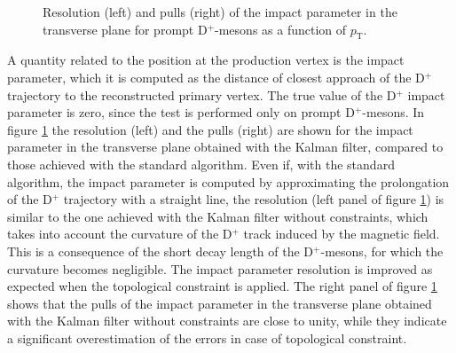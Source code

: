 \documentclass[b5paper,10pt,twoside,oldstyle,classica]{toptesi}
\newcommand{\pt}{p_\text{T}}
\begin{document}
\begin{figure}[b]
\begin{center}
\caption{Resolution (left) and pulls (right) of the impact parameter in the transverse plane for prompt D$^+$-mesons as a function of $\pt$.}
\label{KF_imppar}
\end{center}
\end{figure} A quantity related to the position at the production vertex is the impact parameter, which it is computed as the distance of closest approach of the D$^+$ trajectory to the reconstructed primary vertex. The true value of the D$^+$ impact parameter is zero, since the test is performed only on prompt D$^+$-mesons. In figure \ref{KF_imppar} the resolution (left) and the pulls (right) are shown for the impact parameter in the transverse plane obtained with the Kalman filter, compared to those achieved with the standard algorithm. Even if, with the standard algorithm, the impact parameter is computed by approximating the prolongation of the D$^+$ trajectory with a straight line, the resolution (left panel of figure \ref{KF_imppar}) is similar to the one achieved with the Kalman filter without constraints, which takes into account the curvature of the D$^+$ track induced by the magnetic field. This is a consequence of the short decay length of the D$^+$-mesons, for which the curvature becomes negligible. The impact parameter resolution is improved as expected when the topological constraint is applied. The right panel of figure \ref{KF_imppar} shows that the pulls of the impact parameter in the transverse plane obtained with the Kalman filter without constraints are close to unity, while they indicate a significant overestimation of the errors in case of topological constraint.        
\end{document}
